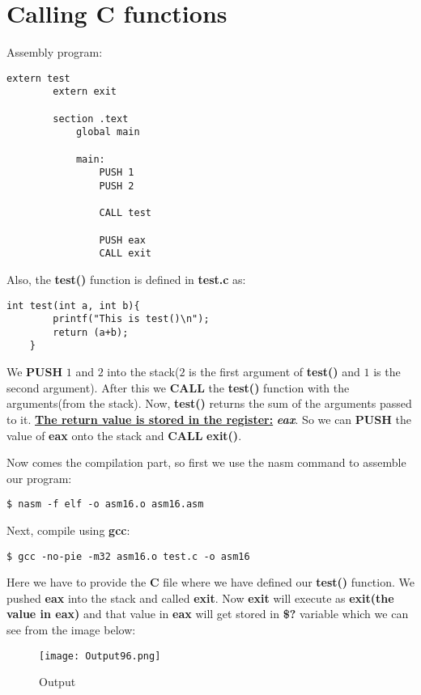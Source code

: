 \documentclass{article}
\makeatletter
\renewcommand\paragraph{\@startsection{paragraph}{4}{\z@}{-3.25ex \@plus -1ex \@minus -.2ex}{1.5ex \@plus .2ex}{\normalfont\normalsize\bfseries}}
\makeatother
\begin{document}
	\section{Calling C functions}\label{sec:sec1}
	\paragraph{}
	Assembly program:
	\begin{lstlisting}[frame=single, breaklines=true]
		extern test
		extern exit
		
		section .text
			global main
			
			main:
				PUSH 1
				PUSH 2
				
				CALL test
				
				PUSH eax
				CALL exit
	\end{lstlisting}
Also, the \textbf{test()} function is defined in \textbf{test.c} as:
\begin{lstlisting}[frame=single, breaklines=true]
	int test(int a, int b){
		printf("This is test()\n");
		return (a+b);
	}
\end{lstlisting}
We \textbf{PUSH} $1$ and $2$ into the stack($2$ is the first argument of \textbf{test()} and $1$ is the second argument). After this we \textbf{CALL} the \textbf{test()} function with the arguments(from the stack). Now, \textbf{test()} returns the sum of the arguments passed to it. \underline{\textbf{The return value is stored in the register:}} \textbf{\textit{eax}}.
So we can \textbf{PUSH} the value of \textbf{eax} onto the stack and \textbf{CALL} \textbf{exit()}.

Now comes the compilation part, so first we use the nasm command to assemble our program:
\begin{lstlisting}[frame=single, breaklines=true]
	$ nasm -f elf -o asm16.o asm16.asm
\end{lstlisting}

Next, compile using \textbf{gcc}:
\begin{lstlisting}[frame=single, breaklines=true]
	$ gcc -no-pie -m32 asm16.o test.c -o asm16
\end{lstlisting}
Here we have to provide the \textbf{C} file where we have defined our \textbf{test()} function.
\newpage
We pushed \textbf{eax} into the stack and called \textbf{exit}. Now \textbf{exit} will execute as \textbf{exit(the value in eax)} and that value in \textbf{eax} will get stored in \textbf{\$?} variable which we can see from the image below:
\begin{figure}[h]
	\centering
	\texttt{[image: Output96.png]}
	\caption{Output}
	\label{fig:fig1}
\end{figure}
\end{document}
